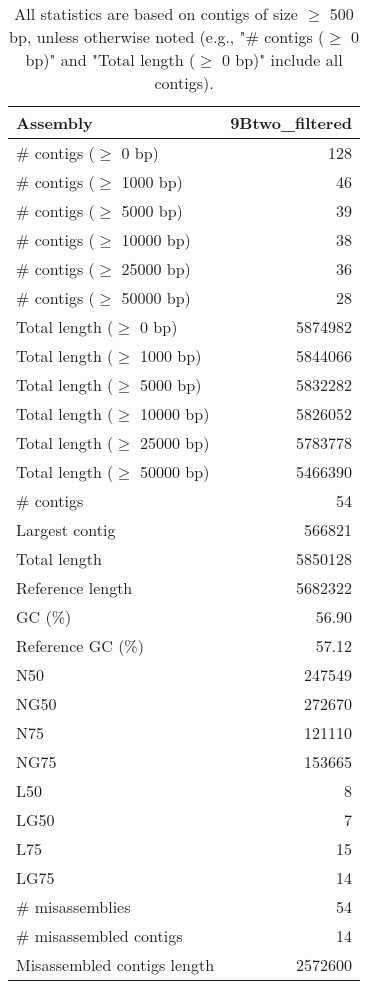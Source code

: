 \documentclass[12pt,a4paper]{article}
\begin{document}
\begin{table}[ht]
\begin{center}
\caption{All statistics are based on contigs of size $\geq$ 500 bp, unless otherwise noted (e.g., "\# contigs ($\geq$ 0 bp)" and "Total length ($\geq$ 0 bp)" include all contigs).}
\begin{tabular}{|l*{1}{|r}|}
\hline
Assembly & 9Btwo\_filtered \\ \hline
\# contigs ($\geq$ 0 bp) & 128 \\ \hline
\# contigs ($\geq$ 1000 bp) & 46 \\ \hline
\# contigs ($\geq$ 5000 bp) & 39 \\ \hline
\# contigs ($\geq$ 10000 bp) & 38 \\ \hline
\# contigs ($\geq$ 25000 bp) & 36 \\ \hline
\# contigs ($\geq$ 50000 bp) & 28 \\ \hline
Total length ($\geq$ 0 bp) & 5874982 \\ \hline
Total length ($\geq$ 1000 bp) & 5844066 \\ \hline
Total length ($\geq$ 5000 bp) & 5832282 \\ \hline
Total length ($\geq$ 10000 bp) & 5826052 \\ \hline
Total length ($\geq$ 25000 bp) & 5783778 \\ \hline
Total length ($\geq$ 50000 bp) & 5466390 \\ \hline
\# contigs & 54 \\ \hline
Largest contig & 566821 \\ \hline
Total length & 5850128 \\ \hline
Reference length & 5682322 \\ \hline
GC (\%) & 56.90 \\ \hline
Reference GC (\%) & 57.12 \\ \hline
N50 & 247549 \\ \hline
NG50 & 272670 \\ \hline
N75 & 121110 \\ \hline
NG75 & 153665 \\ \hline
L50 & 8 \\ \hline
LG50 & 7 \\ \hline
L75 & 15 \\ \hline
LG75 & 14 \\ \hline
\# misassemblies & 54 \\ \hline
\# misassembled contigs & 14 \\ \hline
Misassembled contigs length & 2572600 \\ \hline

\end{tabular}
\end{center}
\end{table}
\end{document}
